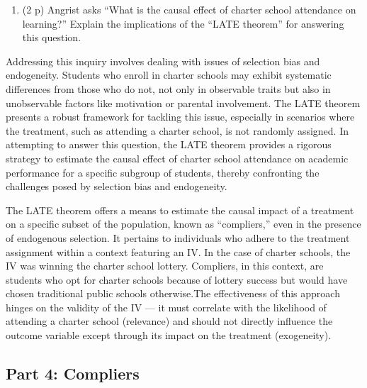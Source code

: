 \documentclass[
]{article}
\providecommand{\tightlist}{%
  \setlength{\itemsep}{0pt}\setlength{\parskip}{0pt}}
\begin{document}
\begin{enumerate}
\def\labelenumi{\arabic{enumi}.}
\setcounter{enumi}{20}
\tightlist
\item
  (2 p) Angrist asks ``What is the causal effect of charter school
  attendance on learning?'' Explain the implications of the ``LATE
  theorem'' for answering this question.
\end{enumerate}

Addressing this inquiry involves dealing with issues of selection bias
and endogeneity. Students who enroll in charter schools may exhibit
systematic differences from those who do not, not only in observable
traits but also in unobservable factors like motivation or parental
involvement. The LATE theorem presents a robust framework for tackling
this issue, especially in scenarios where the treatment, such as
attending a charter school, is not randomly assigned. In attempting to
answer this question, the LATE theorem provides a rigorous strategy to
estimate the causal effect of charter school attendance on academic
performance for a specific subgroup of students, thereby confronting the
challenges posed by selection bias and endogeneity.

The LATE theorem offers a means to estimate the causal impact of a
treatment on a specific subset of the population, known as
``compliers,'' even in the presence of endogenous selection. It pertains
to individuals who adhere to the treatment assignment within a context
featuring an IV. In the case of charter schools, the IV was winning the
charter school lottery. Compliers, in this context, are students who opt
for charter schools because of lottery success but would have chosen
traditional public schools otherwise.The effectiveness of this approach
hinges on the validity of the IV --- it must correlate with the
likelihood of attending a charter school (relevance) and should not
directly influence the outcome variable except through its impact on the
treatment (exogeneity).

\hypertarget{part-4-compliers}{%
\subsection{Part 4: Compliers}\label{part-4-compliers}}
\end{document}
